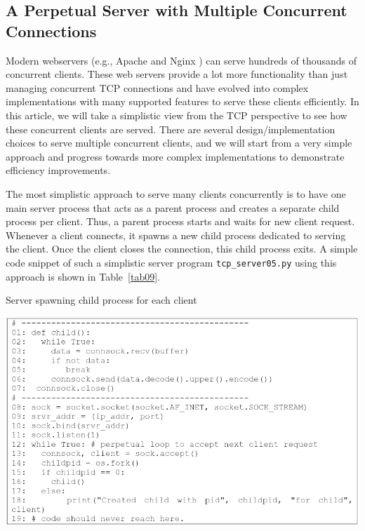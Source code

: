 \begin{multicols}{2}

\vspace{-.17cm}

\section{A Perpetual Server with Multiple Concurrent Connections}

Modern webservers (e.g., Apache \cite{art1-key04} and Nginx \cite{art1-key05}) can serve hundreds of thousands of concurrent clients. These web servers provide a lot more functionality than just managing concurrent TCP connections and have evolved into complex implementations with many supported features to serve these clients efficiently. In this article, we will take a simplistic view from the TCP perspective to see how these concurrent clients are served. There are several design/implementation choices to serve multiple concurrent clients, and we will start from a very simple approach and progress towards more complex implementations to demonstrate efficiency improvements.

The most simplistic approach to serve many clients concurrently is to have one main server process that acts as a parent process and creates a separate child process per client. Thus, a parent process starts and waits for new client request. Whenever a client connects, it spawns a new child process dedicated to serving the client. Once the client closes the connection, this child process exits. A simple code snippet of such a simplistic server program \texttt{tcp\_server05.py} \cite{art1-key17} using this approach is shown in Table~\ref{tab09}.

\end{multicols}

\begin{table}[H]

\vspace{-.8cm}

\centering
\caption{Server spawning child process for each client}\label{tab09}
\includegraphics[scale=2.35]{src/Figures/chap1/tab09.jpg}
\end{table}

